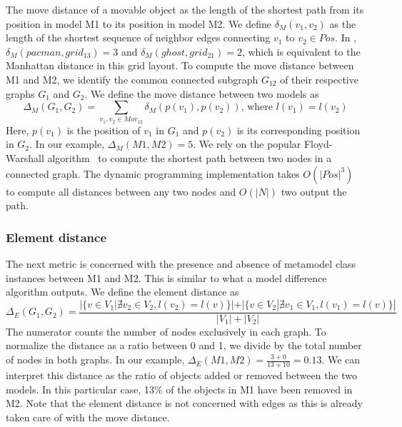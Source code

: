 The move distance of a movable object as the length of the shortest path from its position in model M1 to its position in model M2.
We define $\delta_M(v_1,v_2)$ as the length of the shortest sequence of neighbor edges connecting $v_1$ to $v_2 \in Pos$.
In , $\delta_M(pacman,grid_{13})=3$ and $\delta_M(ghost,grid_{21})=2$, which is equivalent to the Manhattan distance in this grid layout.
To compute the move distance between M1 and M2, we identify the common connected subgraph $G_{12}$ of their respective graphs $G_1$ and $G_2$.
We define the move distance between two models as
\[
\Delta_M(G_1,G_2)=\sum_{v_1,v_2 \in Mov_{12}}{\delta_M(p(v_1),p(v_2))} \mbox{, where } l(v_1)=l(v_2)
\]
Here, $p(v_1)$ is the position of $v_1$ in $G_1$ and $p(v_2)$ is its corresponding position in $G_2$.
In our example, $\Delta_M(M1,M2)=5$.
We rely on the popular Floyd-Warshall algorithm~\cite{Floyd1962,Warshall1962} to compute the shortest path between two nodes in a connected graph.
The dynamic programming implementation takes $O(|Pos|^3)$ to compute all distances between any two nodes and $O(|N|)$ two output the path.


\subsubsection{Element distance}
The next metric is concerned with the presence and absence of metamodel class instances between M1 and M2.
This is similar to what a model difference algorithm outputs.
We define the element distance as
\[
\Delta_E(G_1,G_2)=\frac{|\{v \in V_1 | \nexists v_2 \in V_2, l(v_2)=l(v)\}|+|\{v \in V_2 | \nexists v_1 \in V_1, l(v_1)=l(v)\}|}{|V_1|+|V_2|}
\]
The numerator counts the number of nodes exclusively in each graph.
To normalize the distance as a ratio between 0 and 1, we divide by the total number of nodes in both graphs.
In our example, $\Delta_E(M1,M2)=\frac{3+0}{13+10}=0.13$.
We can interpret this distance as the ratio of objects added or removed between the two models.
In this particular case, 13\% of the objects in M1 have been removed in M2.
Note that the element distance is not concerned with edges as this is already taken care of with the move distance.


